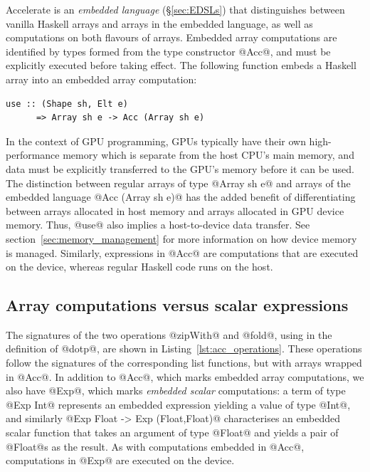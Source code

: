 Accelerate is an \emph{embedded language} (\S\ref{sec:EDSLs}) that distinguishes
between vanilla Haskell arrays and arrays in the embedded language, as well as
computations on both flavours of arrays. Embedded array computations are
identified by types formed from the type constructor @Acc@, and must be
explicitly executed before taking effect. The following function embeds a
Haskell array into an embedded array computation:
%
\begin{lstlisting}[style=haskell]
  use :: (Shape sh, Elt e)
      => Array sh e -> Acc (Array sh e)
\end{lstlisting}
%
In the context of GPU programming, GPUs typically have their own
high-performance memory which is separate from the host CPU's main memory, and
data must be explicitly transferred to the GPU's memory before it can be used.
The distinction between regular arrays of type @Array sh e@ and arrays of the
embedded language @Acc (Array sh e)@ has the added benefit of differentiating
between arrays allocated in host memory and arrays allocated in GPU device
memory. Thus, @use@ also implies a host-to-device data transfer. See
section~\ref{sec:memory_management} for more information on how device memory is
managed. Similarly, expressions in @Acc@ are computations that are executed on
the device, whereas regular Haskell code runs on the host.


\subsection{Array computations versus scalar expressions}
\label{sec:array_computations_vs_scalar_expressions}

The signatures of the two operations @zipWith@ and @fold@, using in the
definition of @dotp@, are shown in Listing~\ref{lst:acc_operations}. These
operations follow the signatures of the corresponding list functions, but with
arrays wrapped in @Acc@. In addition to @Acc@, which marks embedded array
computations, we also have @Exp@, which marks \emph{embedded scalar}
computations: a term of type @Exp Int@ represents an embedded expression
yielding a value of type @Int@, and similarly @Exp Float -> Exp (Float,Float)@
characterises an embedded scalar function that takes an argument of type @Float@
and yields a pair of @Float@s as the result. As with computations embedded in
@Acc@, computations in @Exp@ are executed on the device.


